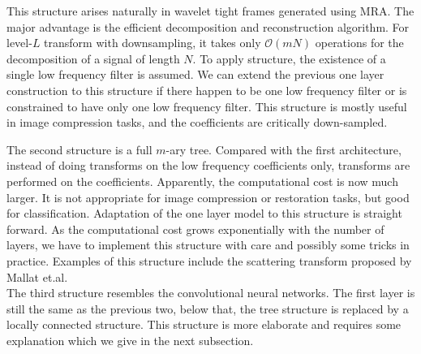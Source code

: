 \documentclass[a4paper]{article}
\begin{document}
This structure arises naturally in wavelet tight frames generated using MRA. The major advantage is the efficient decomposition and reconstruction algorithm. For level-$L$ transform with downsampling, it takes only $\mathcal O(mN)$ operations for the decomposition of a signal of length $N$. To apply structure, the existence of a single low frequency filter is assumed. We can extend the previous one layer construction to this structure if there happen to be one low frequency filter or is constrained to have only one low frequency filter.  This structure is mostly useful in image compression tasks, and the coefficients are critically down-sampled.

The second structure is a full $m$-ary tree. Compared with the first architecture, instead of doing transforms on the low frequency coefficients only,  transforms are performed on the coefficients.  Apparently, the computational cost is now much larger. It is not appropriate for image compression or restoration tasks, but good for classification. Adaptation of the one layer model to this structure is straight forward. As the computational cost grows exponentially with the number of layers, we have to implement this structure with care and possibly some tricks in practice.  Examples of this structure include the scattering transform proposed by Mallat et.al. \\

The third structure resembles the convolutional neural networks. The first layer is still the same as the previous two, below that, the tree structure is replaced by a  locally connected  structure. This structure is more elaborate and requires some explanation which we give in the next subsection.
\end{document}
